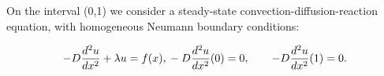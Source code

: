 \documentclass[a4paper,10pt]{report}
\title{}
\author{}
\begin{document}
\maketitle

\begin{abstract}
\end{abstract}

On the interval (0,1) we consider a steady-state convection-diffusion-reaction equation, with homogeneous Neumann boundary conditions:

\begin{equation}
 -D\frac{d^2u}{dx^2}+\lambda u= f(x),\\
 -D\frac{d^2u}{dx^2}(0)=0, \qquad -D\frac{d^2u}{dx^2}(1)=0.
\end{equation}
\end{document}

